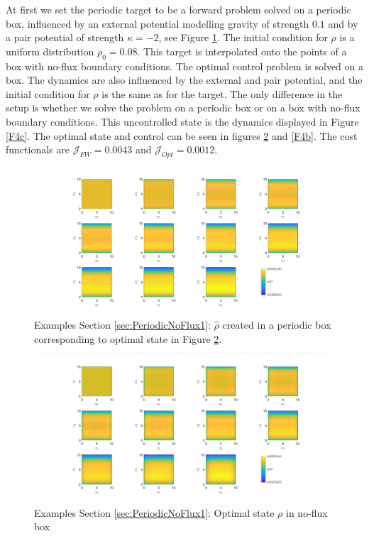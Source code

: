\documentclass[11pt, a4paper]{article}
\theoremstyle{definition}
\newcommand{\hr}{\widehat \rho}
\begin{document}
At first we set the periodic target to be a forward problem solved on a periodic box, influenced by an external potential modelling gravity of strength $0.1$ and by a pair potential of strength $\kappa = -2$, see Figure \ref{F4}. The initial condition for $\rho$ is a uniform distribution $\rho_0 = 0.08$. 
This target is interpolated onto the points of a box with no-flux boundary conditions. The optimal control problem is solved on a box. The dynamics are also influenced by the external and pair potential, and the initial condition for $\rho$ is the same as for the target. The only difference in the setup is whether we solve the problem on a periodic box or on a box with no-flux boundary conditions. This uncontrolled state is the dynamics displayed in Figure \ref{F4c}. The optimal state and control can be seen in figures \ref{F4a} and \ref{F4b}. The cost functionals are $\mathcal J_{FW} = 0.0043$ and $\mathcal J_{Opt} = 0.0012$.

\begin{figure}[h]
	\centering
	\includegraphics[scale=0.35]{rhoHatPeri1.png}
	\caption{Examples Section \ref{sec:PeriodicNoFlux1}: $\hr$ created in a periodic box corresponding to optimal state in Figure \ref{F4a}.} 
	\label{F4}
\end{figure}
\begin{figure}[h]
	\centering
	\includegraphics[scale=0.35]{rhoOptPeri1.png}
	\caption{Examples Section \ref{sec:PeriodicNoFlux1}: Optimal state $\rho$ in no-flux box} 
	\label{F4a}
\end{figure}
\end{document}
